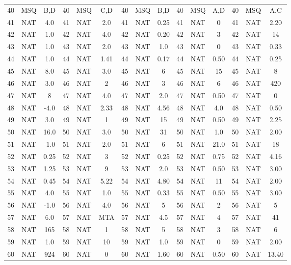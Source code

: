 \documentclass[11pt,a4paper]{article}
\begin{document}
\begin{center}
\begin{tabularx}{\textwidth}{ccc|ccc|ccc|ccc|ccc}
40 & MSQ & B,D & 40 & MSQ & C,D & 40 & MSQ & B,D & 40 & MSQ & A,D & 40 & MSQ & A,C \\
41 & NAT & 4.0 & 41 & NAT & 2.0 & 41 & NAT & 0.25 & 41 & NAT & 0 & 41 & NAT & 2.20 \\
42 & NAT & 1.0 & 42 & NAT & 4.0 & 42 & NAT & 0.20 & 42 & NAT & 3 & 42 & NAT & 14 \\
43 & NAT & 1.0 & 43 & NAT & 2.0 & 43 & NAT & 1.0 & 43 & NAT & 0 & 43 & NAT & 0.33 \\
44 & NAT & 1.0 & 44 & NAT & 1.41 & 44 & NAT & 0.17 & 44 & NAT & 0.50 & 44 & NAT & 0.25 \\
45 & NAT & 8.0 & 45 & NAT & 3.0 & 45 & NAT & 6 & 45 & NAT & 15 & 45 & NAT & 8 \\
46 & NAT & 3.0 & 46 & NAT & 2 & 46 & NAT & 3 & 46 & NAT & 6 & 46 & NAT & 420 \\
47 & NAT & 8 & 47 & NAT & 4.0 & 47 & NAT & 2.0 & 47 & NAT & 0.50 & 47 & NAT & 0 \\
48 & NAT & -4.0 & 48 & NAT & 2.33 & 48 & NAT & 4.56 & 48 & NAT & 4.0 & 48 & NAT & 0.50 \\
49 & NAT & 3.0 & 49 & NAT & 1 & 49 & NAT & 15 & 49 & NAT & 0.50 & 49 & NAT & 2.25 \\
50 & NAT & 16.0 & 50 & NAT & 3.0 & 50 & NAT & 31 & 50 & NAT & 1.0 & 50 & NAT & 2.00 \\
51 & NAT & -1.0 & 51 & NAT & 2.0 & 51 & NAT & 6 & 51 & NAT & 21.0 & 51 & NAT & 18 \\
52 & NAT & 0.25 & 52 & NAT & 3 & 52 & NAT & 0.25 & 52 & NAT & 0.75 & 52 & NAT & 4.16 \\
53 & NAT & 1.25 & 53 & NAT & 9 & 53 & NAT & 2.0 & 53 & NAT & 0.50 & 53 & NAT & 3.00 \\
54 & NAT & 0.45 & 54 & NAT & 5.22 & 54 & NAT & 4.80 & 54 & NAT & 11 & 54 & NAT & 2.00 \\
55 & NAT & 4.0 & 55 & NAT & 1.0 & 55 & NAT & 0.33 & 55 & NAT & 0.50 & 55 & NAT & 3.00 \\
56 & NAT & -1.0 & 56 & NAT & 4.0 & 56 & NAT & 5 & 56 & NAT & 2 & 56 & NAT & 5 \\
57 & NAT & 6.0 & 57 & NAT & MTA & 57 & NAT & 4.5 & 57 & NAT & 4 & 57 & NAT & 41 \\
58 & NAT & 165 & 58 & NAT & 1 & 58 & NAT & 5 & 58 & NAT & 3 & 58 & NAT & 6 \\
59 & NAT & 1.0 & 59 & NAT & 10 & 59 & NAT & 1.0 & 59 & NAT & 0 & 59 & NAT & 2.00 \\
60 & NAT & 924 & 60 & NAT & 0 & 60 & NAT & 1.60 & 60 & NAT & 0.50 & 60 & NAT & 13.40 \\
\bottomrule
\end{tabularx}
\end{center}
\end{document}
